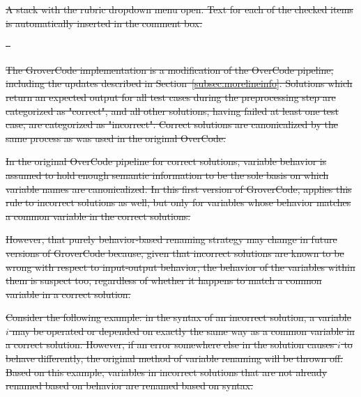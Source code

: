 \documentclass[12pt,twoside]{mitthesis}
\providecommand{\DIFdeltex}[1]{{\protect\color{red}\sout{#1}}}                      %
\providecommand{\DIFdelFL}[1]{\DIFdel{#1}} %
\providecommand{\DIFdel}[1]{\texorpdfstring{\DIFdeltex{#1}}{}} %
\begin{document}
{%
\DIFdelFL{A stack with the rubric dropdown menu open. Text for each of the checked items is automatically inserted in the comment box.}}

\DIFdel{~}%

\DIFdel{The GroverCode implementation is a modification of the OverCode pipeline, including the updates described in Section~\ref{subsec:morelineinfo}. Solutions which return an expected output for all test cases during the preprocessing step are categorized as "correct", and all other solutions, having failed at least one test case, are categorized as "incorrect". Correct solutions are canonicalized by the same process as was used in the original OverCode. 
}%

\DIFdel{In the original OverCode pipeline for correct solutions, variable behavior is assumed to hold enough semantic information to be the sole basis on which variable names are canonicalized. In this first version of GroverCode, applies this rule to incorrect solutions as well, but only for variables whose behavior matches a common variable in the correct solutions. %
}%

\DIFdel{However, that purely behavior-based renaming strategy may change in future versions of GroverCode because, given that incorrect solutions are known to be wrong with respect to input-output behavior, the behavior of the variables within them is suspect too, regardless of whether it happens to match a common variable in a correct solution.
}%

\DIFdel{Consider the following example: in the syntax of an incorrect solution, a variable $i$ may be operated or depended on exactly the same way as a common variable in a correct solution. However, if an error somewhere else in the solution causes $i$ to behave differently, the original method of variable renaming will be thrown off. Based on this example, variables in incorrect solutions that are not already renamed based on behavior are renamed based on syntax.
}%
\end{document}
